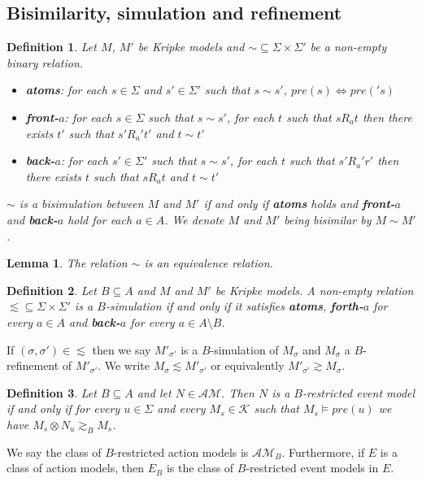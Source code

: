 \documentclass[12pt, a4paper, titlepage]{scrartcl}
\newtheorem{defn}{Definition}[subsection]
\newtheorem{lemma}{Lemma}[subsection]
\numberwithin{equation}{section}
\newcommand{\kripkeClass}{\mathcal{K}}
\newcommand{\eventClass}{\mathcal{AM}}
\newcommand{\FIXME}{{\bf FIXME}}
\begin{document}
\subsection{Bisimilarity, simulation and refinement}

\begin{defn} \label{bisimKripke}
	Let $M$, $M'$ be Kripke models and $\sim \subseteq \Sigma \times \Sigma'$ be a non-empty binary
	relation.
	\begin{itemize}
		\item {\bf atoms}: for each $s \in \Sigma$ and $s' \in \Sigma'$ such that $s \sim s'$, $pre(s)
		\iff pre('s)$
		\item {\bf front-$a$}: for each $s \in \Sigma$ such that $s \sim s'$, for each $t$ such that
		$s R_a t$ then there exists $t'$ such that $s' R_a' t'$ and $t \sim t'$
		\item {\bf back-$a$}: for each $s' \in \Sigma'$ such that $s \sim s'$, for each $t$ such that
		$s' R_a' r'$ then there exists $t$ such that $s R_a t$ and $t \sim t'$
	\end{itemize}
	$\sim$ is a bisimulation between $M$ and $M'$ if and only if {\bf atoms} holds and {\bf front-$a$}
	and {\bf back-$a$} hold for each $a \in A$.
	We denote $M$ and $M'$ being bisimilar by $M \sim M'$.
\end{defn}

\begin{lemma} \label{bisimEquivalence}
	The relation $\sim$ is an equivalence relation.
\end{lemma}

\begin{defn} \label{refinement}
Let $B \subseteq A$ and $M$ and $M'$ be Kripke models. A non-empty relation $\lesssim \subseteq \Sigma
\times \Sigma'$ is a $B$-simulation if and only if it satisfies {\bf atoms}, {\bf forth-$a$} for
every $a \in A$ and {\bf back-$a$} for every $a \in A \setminus B$.
\end{defn}
If $(\sigma, \sigma') \in \lesssim$ then we say $M'_{\sigma'}$ is a $B$-simulation of $M_\sigma$ and
$M_\sigma$ a $B$-refinement of $M'_{\sigma'}$.
We write $M_{\sigma} \lesssim M'_{\sigma'}$ or equivalently $M'_{\sigma'} \gtrsim M_{\sigma}$.

\begin{defn} \label{brestrict}
Let $B \subseteq A$ and let $N \in \eventClass$. Then $N$ is a $B$-restricted event model if and
only if for every $u \in \Sigma$ and every $M_s \in \kripkeClass$ such that $M_s \models pre(u)$ we
have $M_s \otimes N_u \gtrsim_B M_s$.
\end{defn}
We say the class of $B$-restricted action models is $\eventClass_B$.
Furthermore, if $E$ is a class of action models, then $E_B$ is the class of $B$-restricted event
models in $E$.
\end{document}

